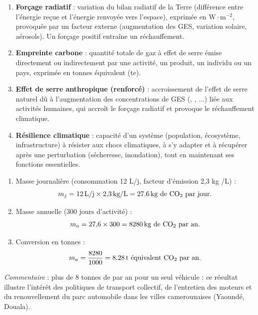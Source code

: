 \documentclass[11pt]{article}
\begin{document}
\begin{corrige}
\begin{enumerate}
    \item \textbf{Forçage radiatif} : variation du bilan radiatif de la Terre (différence entre l'énergie reçue et l'énergie renvoyée vers l'espace), exprimée en $ \text{W}\cdot\text{m}^{-2} $, provoquée par un facteur externe (augmentation des GES, variation solaire, aérosols). Un forçage positif entraîne un réchauffement.
    \item \textbf{Empreinte carbone} : quantité totale de gaz à effet de serre émise directement ou indirectement par une activité, un produit, un individu ou un pays, exprimée en tonnes équivalent  (te).
    \item \textbf{Effet de serre anthropique (renforcé)} : accroissement de l'effet de serre naturel dû à l'augmentation des concentrations de GES (, , ...) liée aux activités humaines, qui accroît le forçage radiatif et provoque le réchauffement climatique.
    \item \textbf{Résilience climatique} : capacité d'un système (population, écosystème, infrastructure) à résister aux chocs climatiques, à s'y adapter et à récupérer après une perturbation (sécheresse, inondation), tout en maintenant ses fonctions essentielles.
\end{enumerate}
\end{corrige}

\begin{corrige}
\begin{enumerate}
    \item Masse journalière (consommation 12 L/j, facteur d'émission 2,3 kg /L) :
    \[ m_j = 12\,\text{L/j} \times 2{,}3\,\text{kg/L} = \SI{27,6}{kg} \text{ de } \ce{CO2} \text{ par jour.} \]
    \item Masse annuelle (300 jours d'activité) :
    \[ m_a = 27{,}6 \times 300 = \SI{8280}{kg} \text{ de } \ce{CO2} \text{ par an.} \]
    \item Conversion en tonnes :
    \[ m_a = \frac{8280}{1000} = \SI{8,28}{t} \text{ équivalent } \ce{CO2} \text{ par an.} \]
\end{enumerate}
\emph{Commentaire} : plus de 8 tonnes de  par an pour un seul véhicule : ce résultat illustre l'intérêt des politiques de transport collectif, de l'entretien des moteurs et du renouvellement du parc automobile dans les villes camerounaises (Yaoundé, Douala).
\end{corrige}
\end{document}
